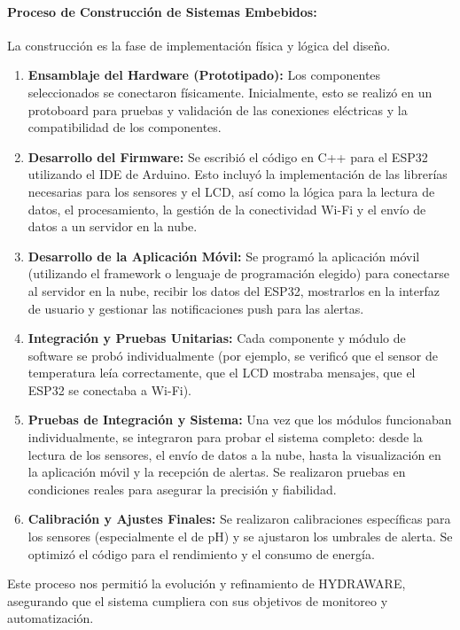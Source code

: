 \documentclass[a4paper,12pt]{article}
\begin{document}
	\paragraph{Proceso de Construcción de Sistemas Embebidos:}
	La construcción es la fase de implementación física y lógica del diseño.
	\begin{enumerate}
		\item \textbf{Ensamblaje del Hardware (Prototipado):} Los componentes seleccionados se conectaron físicamente. Inicialmente, esto se realizó en un protoboard para pruebas y validación de las conexiones eléctricas y la compatibilidad de los componentes.
		\item \textbf{Desarrollo del Firmware:} Se escribió el código en C++ para el ESP32 utilizando el IDE de Arduino. Esto incluyó la implementación de las librerías necesarias para los sensores y el LCD, así como la lógica para la lectura de datos, el procesamiento, la gestión de la conectividad Wi-Fi y el envío de datos a un servidor en la nube.
		\item \textbf{Desarrollo de la Aplicación Móvil:} Se programó la aplicación móvil (utilizando el framework o lenguaje de programación elegido) para conectarse al servidor en la nube, recibir los datos del ESP32, mostrarlos en la interfaz de usuario y gestionar las notificaciones push para las alertas.
		\item \textbf{Integración y Pruebas Unitarias:} Cada componente y módulo de software se probó individualmente (por ejemplo, se verificó que el sensor de temperatura leía correctamente, que el LCD mostraba mensajes, que el ESP32 se conectaba a Wi-Fi).
		\item \textbf{Pruebas de Integración y Sistema:} Una vez que los módulos funcionaban individualmente, se integraron para probar el sistema completo: desde la lectura de los sensores, el envío de datos a la nube, hasta la visualización en la aplicación móvil y la recepción de alertas. Se realizaron pruebas en condiciones reales para asegurar la precisión y fiabilidad.
		\item \textbf{Calibración y Ajustes Finales:} Se realizaron calibraciones específicas para los sensores (especialmente el de pH) y se ajustaron los umbrales de alerta. Se optimizó el código para el rendimiento y el consumo de energía.
	\end{enumerate}
	Este proceso nos permitió la evolución y refinamiento de HYDRAWARE, asegurando que el sistema cumpliera con sus objetivos de monitoreo y automatización.
	
\end{document}
